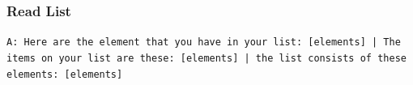 \subsubsection{ Read List}
\texttt{A: Here are the element that you have in your list: [elements] | The items on your list are these: [elements] |  the list consists of these elements: [elements]}\\

